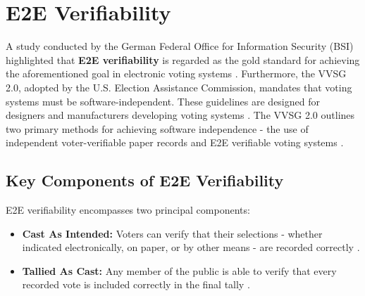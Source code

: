\section{\ac{E2E} Verifiability}
A study conducted by the German Federal Office for Information Security (BSI) highlighted that \textbf{\ac{E2E} verifiability} is regarded as the gold standard for achieving the aforementioned goal in electronic voting systems \cite[10]{stuve-study}. Furthermore, the \ac{VVSG} 2.0, adopted by the U.S. Election Assistance Commission, mandates that voting systems must be software-independent. These guidelines are designed for designers and manufacturers developing voting systems \cite{vvsg-intro}. The \ac{VVSG} 2.0 outlines two primary methods for achieving software independence - the use of independent voter-verifiable paper records and \ac{E2E} verifiable voting systems \cite[181]{vvsg}. 

\subsection{Key Components of \ac{E2E} Verifiability}
\ac{E2E} verifiability encompasses two principal components:
\begin{itemize}
    \item \textbf{Cast As Intended:} Voters can verify that their selections - whether indicated electronically, on paper, or by other means - are recorded correctly \cite[2]{e2e-primer}.
    \item \textbf{Tallied As Cast:} Any member of the public is able to verify that every recorded vote is included correctly in the final tally \cite[2]{e2e-primer}.
\end{itemize}

